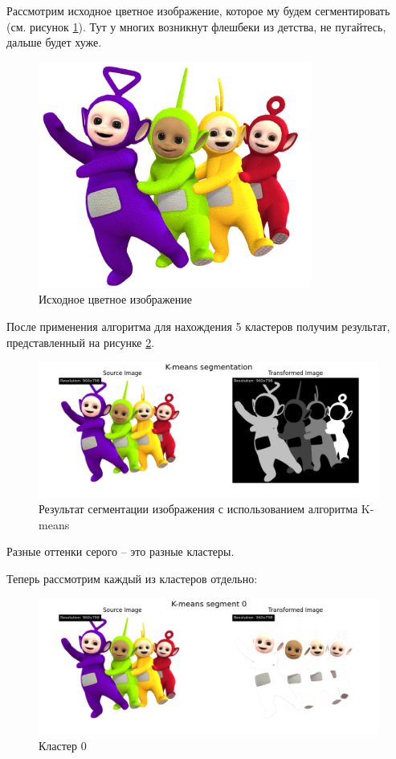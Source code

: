 Рассмотрим исходное цветное изображение, которое му будем сегментировать (см. рисунок \ref{img:source_color}).
Тут у многих возникнут флешбеки из детства, не пугайтесь, дальше будет хуже. 
\begin{figure}[ht!]
    \centering
    \includegraphics[width=0.8\textwidth]{../puziki.png}
    \caption{Исходное цветное изображение}
    \label{img:source_color}
\end{figure}

После применения алгоритма для нахождения 5 кластеров получим результат, представленный на рисунке \ref{img:kmeans_segmentation}.
\begin{figure}[ht!]
    \centering
    \includegraphics[width=\textwidth]{../results/K-means segmentation.png}
    \caption{Результат сегментации изображения с использованием алгоритма K-means}
    \label{img:kmeans_segmentation}
\end{figure}
Разные оттенки серого -- это разные кластеры. 

\FloatBarrier
Теперь рассмотрим каждый из кластеров отдельно: 

\begin{figure}[ht!]
    \centering
    \includegraphics[width=\textwidth]{../results/K-means segment 0.png}
    \caption{Кластер 0}
    \label{img:kmeans_cluster_0}
\end{figure}

